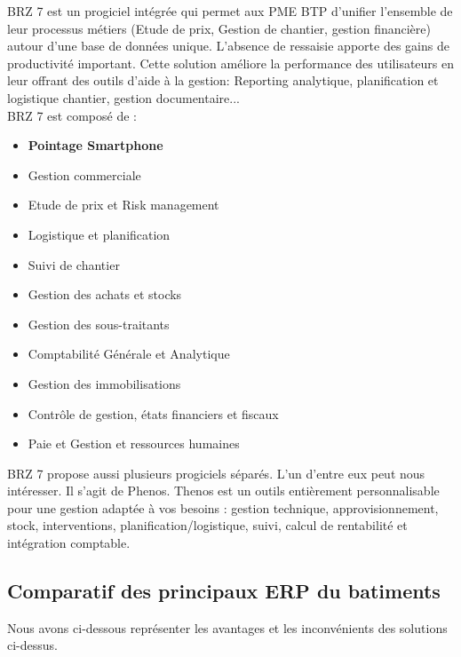                 BRZ 7 est un progiciel intégrée qui permet aux PME BTP d'unifier l'ensemble de leur processus métiers (Etude de prix, Gestion de chantier, gestion financière) autour d'une base de données unique.
    L'absence de ressaisie apporte des gains de productivité important.
    Cette solution améliore la performance des utilisateurs en leur offrant des outils d'aide à la gestion: Reporting analytique,
    planification et logistique chantier, gestion documentaire...\\
                BRZ 7 est composé de :

     \begin{itemize}
                  \item \textbf{Pointage Smartphone}
                  \item Gestion commerciale
                  \item Etude de prix et Risk management
                  \item Logistique et planification
                  \item Suivi de chantier
                  \item Gestion des achats et stocks
                  \item Gestion des sous-traitants
                  \item Comptabilité Générale et Analytique
                  \item Gestion des immobilisations
                  \item Contrôle de gestion, états financiers et fiscaux
                  \item Paie et Gestion et ressources humaines\\
                \end{itemize}

                BRZ 7 propose aussi plusieurs progiciels séparés. L'un d'entre eux peut nous intéresser. Il s'agit de Phenos.
    Thenos est un outils entièrement personnalisable pour une gestion adaptée à vos besoins :
    gestion technique, approvisionnement, stock, interventions, planification/logistique, suivi, calcul de rentabilité et intégration comptable.


\subsection{Comparatif des principaux ERP du batiments}

Nous avons ci-dessous représenter les avantages et les inconvénients des solutions ci-dessus.


